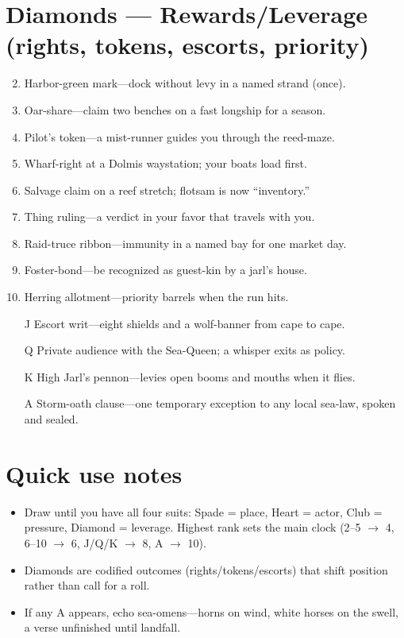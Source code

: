\section*{Diamonds --- Rewards/Leverage (rights, tokens, escorts, priority)}
\begin{enumerate}
\setcounter{enumi}{1}
\item Harbor-green mark---dock without levy in a named strand (once).
\item Oar-share---claim two benches on a fast longship for a season.
\item Pilot's token---a mist-runner guides you through the reed-maze.
\item Wharf-right at a Dolmis waystation; your boats load first.
\item Salvage claim on a reef stretch; flotsam is now ``inventory.''
\item Thing ruling---a verdict in your favor that travels with you.
\item Raid-truce ribbon---immunity in a named bay for one market day.
\item Foster-bond---be recognized as guest-kin by a jarl's house.
\item Herring allotment---priority barrels when the run hits.
\item[J] Escort writ---eight shields and a wolf-banner from cape to cape.
\item[Q] Private audience with the Sea-Queen; a whisper exits as policy.
\item[K] High Jarl's pennon---levies open booms and mouths when it flies.
\item[A] Storm-oath clause---one temporary exception to any local sea-law, spoken and sealed.
\end{enumerate}

\section*{Quick use notes}
\begin{itemize}
\item Draw until you have all four suits: Spade = place, Heart = actor, Club = pressure, Diamond = leverage. Highest rank sets the main clock (2--5 $\rightarrow$ 4, 6--10 $\rightarrow$ 6, J/Q/K $\rightarrow$ 8, A $\rightarrow$ 10).
\item Diamonds are codified outcomes (rights/tokens/escorts) that shift position rather than call for a roll.
\item If any A appears, echo sea-omens---horns on wind, white horses on the swell, a verse unfinished until landfall.
\end{itemize}
